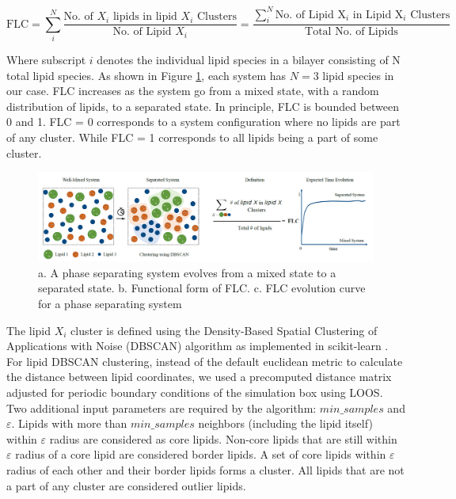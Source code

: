 \documentclass{biophys-new}
\begin{document}
\begin{equation}
\label{eq:CLT}
\text{FLC} = \sum_{i}^{N} \frac{\text{No. of $X_i$ lipids in lipid $X_i$ Clusters}}{\text{No. of Lipid $X_i$}} =  \frac{\sum_{i}^{N} \text{No. of Lipid X$_i$ in Lipid X$_i$ Clusters}}{\text{Total No. of Lipids}}
\end{equation}


Where subscript $i$ denotes the individual lipid species in a bilayer consisting of N total lipid species.
As shown in Figure \ref{fig1:view}, each system has $N=3$ lipid species in our case.
FLC increases as the system go from a mixed state, with a random distribution of lipids, to a separated state.
In principle, FLC is bounded between 0 and 1. FLC = 0 corresponds to a system configuration where no lipids are part of any cluster.
While FLC = 1 corresponds to all lipids being a part of some cluster. 

\begin{figure}[hbt!]
\centering
\includegraphics[width=1\linewidth]{Figures/Figure1.PNG}
\caption{a. A phase separating system evolves from a mixed state to a separated state. b. Functional form of FLC. c. FLC evolution curve for a phase separating system}
\label{fig1:view}

\end{figure}


The lipid $X_i$ cluster is defined using the Density-Based Spatial Clustering of Applications with Noise (DBSCAN) algorithm \cite{MartinEsterHans-PeterKriegelJiirgSander1996,Ester2017} as implemented in scikit-learn \cite{PedregosaF.VaroquauxG.GramfortA.MichelV.ThirionB.GriselO.BlondelM.PrettenhoferP.WeissR.andDubourgV.VanderplasJ.PassosA.CournapeauD.BrucherM.PerrotM.Duchesnay2011}.
For lipid DBSCAN clustering, instead of the default euclidean metric to calculate the distance between lipid coordinates, we used a precomputed distance matrix adjusted for periodic boundary conditions of the simulation box using LOOS.
Two additional input parameters are required by the algorithm: $min\_samples$ and $\varepsilon$.
Lipids with more than $min\_samples$ neighbors (including the lipid itself) within $\varepsilon$ radius are considered as core lipids.
Non-core lipids that are still within $\varepsilon$ radius of a core lipid are considered border lipids.
A set of core lipids within $\varepsilon$ radius of each other and their border lipids forms a cluster.
All lipids that are not a part of any cluster are considered outlier lipids.
\end{document}
